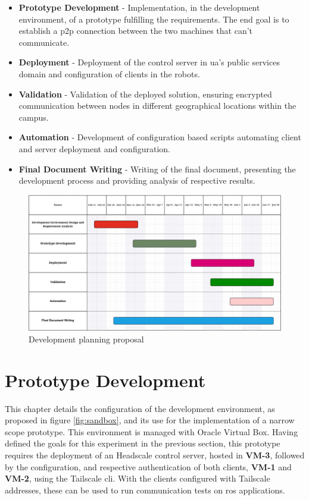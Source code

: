 \documentclass[11pt,twoside,a4paper]{report}
\begin{document}
\begin{itemize}
  \item \textbf{Prototype Development} - Implementation, in the development environment, of a prototype fulfilling the requirements. The end goal is to establish a \ac{p2p} connection between the two machines that can't communicate.
  \item \textbf{Deployment} - Deployment of the control server in \ac{ua}'s public services domain and configuration of clients in the robots.
  \item \textbf{Validation} - Validation of the deployed solution, ensuring encrypted communication between nodes in different geographical locations within the campus.
  \item \textbf{Automation} - Development of configuration based scripts automating client and server deployment and configuration.
  \item \textbf{Final Document Writing} - Writing of the final document, presenting the development process and providing analysis of respective results.
\end{itemize}

\begin{figure}[h]
\centering
\includegraphics[width=1\textwidth]{gantt.png}
\caption{Development planning proposal}
\label{fig:gantt}
\end{figure}

\chapter{Prototype Development}

This chapter details the configuration of the development environment, as proposed in figure \ref{fig:sandbox}, and its use for the implementation of a narrow scope prototype. This environment is managed with Oracle Virtual Box. Having defined the goals for this experiment in the previous section, this prototype requires the deployment of an Headscale control server, hosted in \textbf{VM-3}, followed by the configuration, and respective authentication of both clients, \textbf{VM-1} and \textbf{VM-2}, using the Tailscale \ac{cli}. With the clients configured with Tailscale addresses, these can be used to run communication tests on \ac{ros} applications.
\end{document}

